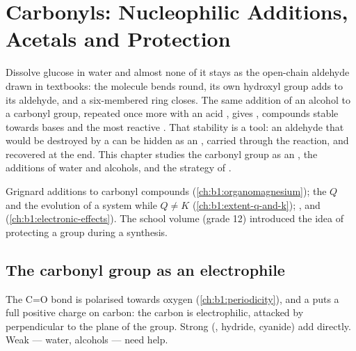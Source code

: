 \chapter{Carbonyls: Nucleophilic Additions, Acetals and Protection}\label{ch:b1:acetals-protection}

Dissolve glucose in water and almost none of it stays as the open-chain
aldehyde drawn in textbooks: the molecule bends round, its own hydroxyl
group adds to its aldehyde, and a six-membered ring closes. The same
addition of an alcohol to a carbonyl group, repeated once more with an
acid , gives , compounds stable towards bases and the most
reactive . That stability is a tool: an aldehyde that would
be destroyed by a  can be hidden as an , carried
through the reaction, and recovered at the end. This chapter studies the
carbonyl group as an , the additions of water and alcohols,
and the strategy of .

\begin{recall}
Grignard additions to carbonyl compounds (\cref{ch:b1:organomagnesium});
the  $Q$ and the evolution of a system while $Q \neq K$
(\cref{ch:b1:extent-q-and-k}); ,  and
 (\cref{ch:b1:electronic-effects}). The school volume (grade
12) introduced the idea of protecting a group during a synthesis.
\end{recall}

\section{The carbonyl group as an electrophile}

The C=O bond is polarised towards oxygen (\cref{ch:b1:periodicity}), and
a   puts a full positive charge on carbon:
the carbon is electrophilic, attacked by  perpendicular to the
plane of the group. Strong  (, hydride,
cyanide) add directly. Weak  --- water, alcohols --- need help.

